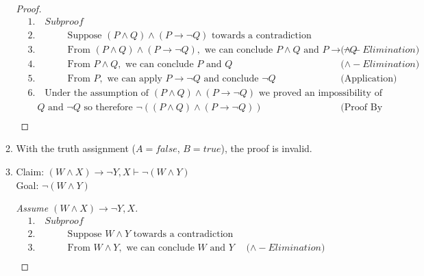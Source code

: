 \documentclass{article}
\begin{document}
\begin{enumerate}
\begin{enumerate}
        \begin{proof}[Proof]
            \begin{align*}
                &1. \quad Subproof \\
                &2. \quad \hspace{1cm} \text{Suppose } (P \land Q) \land (P \rightarrow \neg Q) \text{ towards a contradiction} \\
                &3. \quad \hspace{1cm} \text{From } (P \land Q) \land (P \rightarrow \neg Q), \text{ we can conclude } P \land Q \text{ and } P \rightarrow \neg Q && \text{($\land - Elimination$)} \\
                &4. \quad \hspace{1cm} \text{From } P \land Q, \text{ we can conclude } P \text{ and } Q && \text{($\land - Elimination$)} \\
                &5. \quad \hspace{1cm} \text{From } P, \text{ we can apply } P \rightarrow \neg Q \text{ and conclude } \neg Q && \text{(Application)} \\
                &6. \quad \text{Under the assumption of } (P \land Q) \land (P \rightarrow \neg Q) \text{ we proved an impossibility of } \\
                &\quad Q \text{ and } \neg Q \text{ so therefore } \neg ((P \land Q) \land (P \rightarrow \neg Q)) && \text{(Proof By Contradiction)} \\
            \end{align*}
        \end{proof}
        \item With the truth assignment ($A = false$, $B = true$), the proof is invalid.
        \item
        Claim: $(W \land X) \rightarrow \neg Y, X \vdash \neg (W \land Y)$ \\
        Goal: $\neg (W \land Y)$
        \begin{proof}[Assume $(W \land X) \rightarrow \neg Y, X$]
            \begin{align*}
                &1. \quad Subproof \\
                &2. \quad \hspace{1cm} \text{Suppose } W \land Y \text{ towards a contradiction} \\
                &3. \quad \hspace{1cm} \text{From } W \land Y, \text{ we can conclude } W \text{ and } Y && \text{($\land - Elimination$)} \\

\end{align*}
\end{proof}
\end{enumerate}
\end{enumerate}
\end{document}
